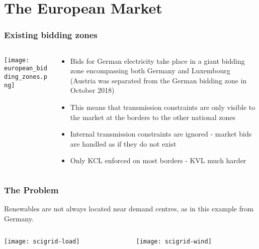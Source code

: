 \documentclass[10pt,aspectratio=169,dvipsnames]{beamer}
\let\olditem\item
\renewcommand{\item}{%
\olditem\vspace{5pt}}
\begin{document}
\section{The European Market}


\begin{frame}
  \frametitle{Existing bidding zones}



\begin{columns}[T]
  \begin{column}{5cm}

    \texttt{[image: european\_bidding\_zones.png]}
  \end{column}

  \begin{column}{8cm}

    \begin{itemize}
    \item Bids for German electricity take place in a \alert{giant bidding zone} encompassing both Germany and Luxembourg (Austria was separated from the German bidding zone in October 2018)
    \item This means that transmission constraints are only visible to the market at the \alert{borders} to the other national zones
    \item Internal transmission constraints are \alert{ignored} - market bids are handled as if they do not exist
    \item Only KCL enforced on most borders - KVL much harder
    \end{itemize}

\end{column}
\end{columns}


\end{frame}


\begin{frame}
  \frametitle{The Problem}

  Renewables are not always located near demand centres, as in this example from Germany.



\begin{columns}[T]
  \begin{column}{6cm}
\texttt{[image: scigrid-load]}
  \end{column}

  \begin{column}{6cm}
  \texttt{[image: scigrid-wind]}


\end{column}
\end{columns}

\end{frame}
\end{document}
